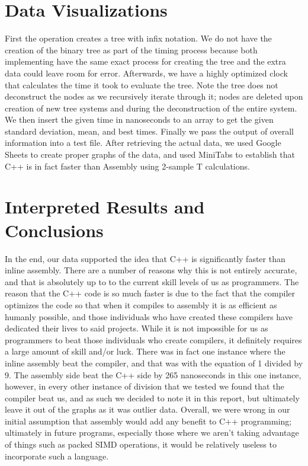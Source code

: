 \documentclass[a4paper,10pt]{article}
\begin{document}
\section*{Data Visualizations}
\smallskip
First the operation creates a tree with infix notation. We do not have the creation of the binary tree as part of the timing process because both implementing have the same exact process for creating the tree and the extra data could leave room for error. Afterwards, we have a highly optimized clock that calculates the time it took to evaluate the tree. Note the tree does not deconstruct the nodes as we recursively iterate through it; nodes are deleted upon creation of new tree systems and during the deconstruction of the entire system. We then insert the given time in nanoseconds to an array to get the given standard deviation, mean, and best times. Finally we pass the output of overall information into a test file. After retrieving the actual data, we used Google Sheets to create proper graphs of the data, and used MiniTabs to establish that C++ is in fact faster than Assembly using 2-sample T calculations. 

\section*{Interpreted Results and Conclusions}
\smallskip
In the end, our data supported the idea that C++ is significantly faster than inline assembly. There are a number of reasons why this is not entirely accurate, and that is absolutely up to to the current skill levels of us as programmers. The reason that the C++ code is so much faster is due to the fact that the compiler optimizes the code so that when it compiles to assembly it is as efficient as humanly possible, and those individuals who have created these compilers have dedicated their lives to said projects. While it is not impossible for us as programmers to beat those individuals who create compilers, it definitely requires a large amount of skill and/or luck. There was in fact one instance where the inline assembly beat the compiler, and that was with the equation of 1 divided by 9. The assembly side beat the C++ side by 265 nanoseconds in this one instance, however, in every other instance of division that we tested we found that the compiler beat us, and as such we decided to note it in this report, but ultimately leave it out of the graphs as it was outlier data. Overall, we were wrong in our initial assumption that assembly would add any benefit to C++ programming; ultimately in future programs, especially those where we aren't taking advantage of things such as packed SIMD operations, it would be relatively useless to incorporate such a language.
\end{document}
